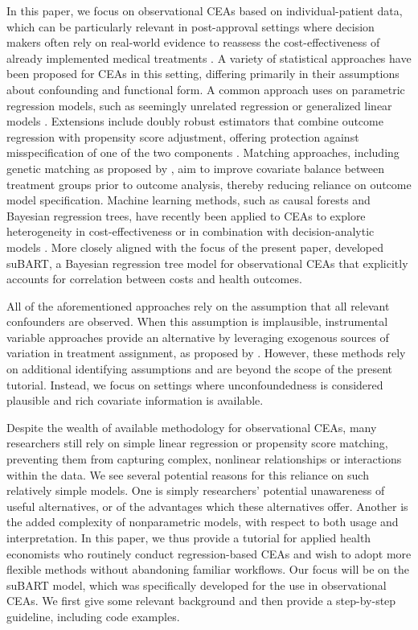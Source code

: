 \documentclass[aoas,preprint]{imsart}
\theoremstyle{plain}
\theoremstyle{definition}
\theoremstyle{remark}
\theoremstyle{remark}
\begin{document}
In this paper, we focus on observational CEAs based on individual-patient data, which can be particularly relevant in post-approval settings where decision makers often rely on real-world evidence to reassess the cost-effectiveness of already implemented medical treatments \citep{Sculpher2006}. A variety of statistical approaches have been proposed for CEAs in this setting, differing primarily in their assumptions about confounding and functional form. A common approach uses on parametric regression models, such as seemingly unrelated regression or generalized linear models \citep{kreif2013statistical}. Extensions include doubly robust estimators that combine outcome regression with propensity score adjustment, offering protection against misspecification of one of the two components \citep{kreif2013regression}.
Matching approaches, including genetic matching as proposed by \citet{SekhonGrieve2011}, aim to improve covariate balance between treatment groups prior to outcome analysis, thereby reducing reliance on outcome model specification. 
Machine learning methods, such as causal forests and Bayesian regression trees, have recently been applied to CEAs to explore heterogeneity in cost-effectiveness or in combination with decision-analytic models \citep{bonander2021using,Glynn2024}. More closely aligned with the focus of the present paper, \citet{esser2025seemingly} developed suBART, a Bayesian regression tree model for observational CEAs that explicitly accounts for correlation between costs and health outcomes.

All of the aforementioned approaches rely on the assumption that all relevant confounders are observed. When this assumption is implausible, instrumental variable approaches provide an alternative by leveraging exogenous sources of variation in treatment assignment, as proposed by \citet{MolerZapata2022}. However, these methods rely on additional identifying assumptions and are beyond the scope of the present tutorial. Instead, we focus on settings where unconfoundedness is considered plausible and rich covariate information is available.

Despite the wealth of available methodology for observational CEAs, many researchers still rely on simple linear regression or propensity score matching, preventing them from capturing complex, nonlinear relationships or interactions within the data.
We see several potential reasons for this reliance on such relatively simple models. One is simply researchers' potential unawareness of useful alternatives, or of the advantages which these alternatives offer. Another is the added complexity of nonparametric models, with respect to both usage and interpretation.
In this paper, we thus provide a tutorial for applied health economists who routinely conduct regression-based CEAs and wish to adopt more flexible methods without abandoning familiar workflows. Our focus will be on the suBART model, which was specifically developed for the use in observational CEAs. We first give some relevant background and then provide a step-by-step guideline, including code examples.
\end{document}
